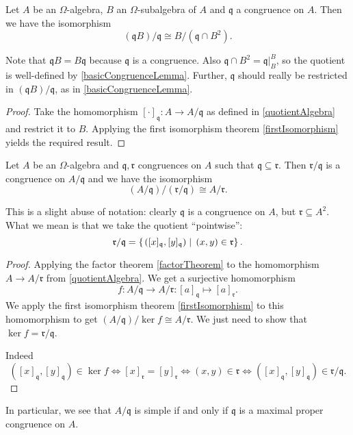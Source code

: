 \begin{theorem}
Let $A$ be an $\Omega$-algebra, $B$ an $\Omega$-subalgebra of $A$ and $\mathfrak{q}$ a congruence on $A$. Then we have the isomorphism
\[ (\mathfrak{q}B)/\mathfrak{q} \cong B/(\mathfrak{q}\cap B^2). \]
\end{theorem}
Note that $\mathfrak{q}B = B\mathfrak{q}$ because $\mathfrak{q}$ is a congruence. Also $\mathfrak{q}\cap B^2 = \mathfrak{q}|_B^B$, so the quotient is well-defined by \ref{basicCongruenceLemma}. Further, $\mathfrak{q}$ should really be restricted in $(\mathfrak{q}B)/\mathfrak{q}$, as in \ref{basicCongruenceLemma}.
\begin{proof}
Take the homomorphism $[\cdot]_\mathfrak{q}:A \to A/\mathfrak{q}$ as defined in \ref{quotientAlgebra} and restrict it to $B$. Applying the first isomorphism theorem \ref{firstIsomorphism} yields the required result.
\end{proof}

\begin{theorem}
Let $A$ be an $\Omega$-algebra and $\mathfrak{q},\mathfrak{r}$ congruences on $A$ such that $\mathfrak{q} \subseteq \mathfrak{r}$. Then $\mathfrak{r}/\mathfrak{q}$ is a congruence on $A/\mathfrak{q}$ and we have the isomorphism
\[ (A/\mathfrak{q})/(\mathfrak{r}/\mathfrak{q}) \cong A/\mathfrak{r}. \]
\end{theorem}
This is a slight abuse of notation: clearly $\mathfrak{q}$ is a congruence on $A$, but $\mathfrak{r}\subseteq A^2$. What we mean is that we take the quotient ``pointwise'':
\[ \mathfrak{r}/\mathfrak{q} = \left\{\left. ([x]_\mathfrak{q}, [y]_\mathfrak{q}) \;\right|\; (x,y)\in \mathfrak{r} \right\}. \]
\begin{proof}
Applying the factor theorem \ref{factorTheorem} to the homomorphism $A\to A/\mathfrak{r}$ from \ref{quotientAlgebra}. We get a surjective homomorphism
\[ f: A/\mathfrak{q} \to A/\mathfrak{r}: [a]_\mathfrak{q} \mapsto [a]_{\mathfrak{r}}. \]
We apply the first isomorphism theorem \ref{firstIsomorphism} to this homomorphism to get $(A/\mathfrak{q})/\ker f \cong A/\mathfrak{r}$. We just need to show that $\ker f = \mathfrak{r}/\mathfrak{q}$.

Indeed
\[ ([x]_\mathfrak{q},[y]_\mathfrak{q}) \in \ker f \iff [x]_\mathfrak{r} = [y]_\mathfrak{r} \iff (x, y)\in \mathfrak{r} \iff ([x]_\mathfrak{q},[y]_\mathfrak{q}) \in \mathfrak{r}/\mathfrak{q}. \]
\end{proof}
In particular, we see that $A/\mathfrak{q}$ is simple if and only if $\mathfrak{q}$ is a maximal proper congruence on $A$.

